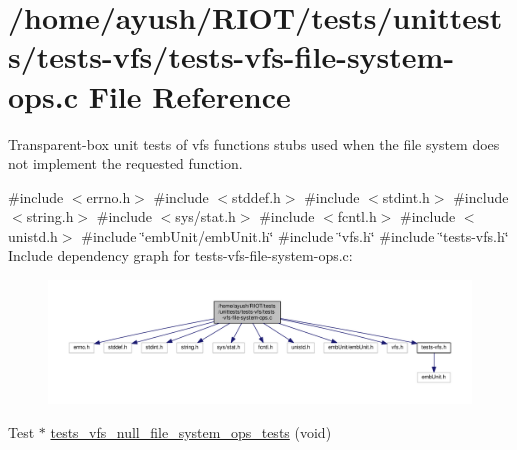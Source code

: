 \hypertarget{tests-vfs-file-system-ops_8c}{}\section{/home/ayush/\+R\+I\+O\+T/tests/unittests/tests-\/vfs/tests-\/vfs-\/file-\/system-\/ops.c File Reference}
\label{tests-vfs-file-system-ops_8c}


Transparent-\/box unit tests of vfs functions stubs used when the file system does not implement the requested function.  


{\ttfamily \#include $<$errno.\+h$>$}\newline
{\ttfamily \#include $<$stddef.\+h$>$}\newline
{\ttfamily \#include $<$stdint.\+h$>$}\newline
{\ttfamily \#include $<$string.\+h$>$}\newline
{\ttfamily \#include $<$sys/stat.\+h$>$}\newline
{\ttfamily \#include $<$fcntl.\+h$>$}\newline
{\ttfamily \#include $<$unistd.\+h$>$}\newline
{\ttfamily \#include \char`\"{}emb\+Unit/emb\+Unit.\+h\char`\"{}}\newline
{\ttfamily \#include \char`\"{}vfs.\+h\char`\"{}}\newline
{\ttfamily \#include \char`\"{}tests-\/vfs.\+h\char`\"{}}\newline
Include dependency graph for tests-\/vfs-\/file-\/system-\/ops.c\+:
\nopagebreak
\begin{figure}[H]
\begin{center}
\leavevmode
\includegraphics[width=350pt]{tests-vfs-file-system-ops_8c__incl}
\end{center}
\end{figure}
\begin{DoxyCompactItemize}
\item 
Test $\ast$ \hyperlink{tests-vfs-file-system-ops_8c_af7fa3a64422e93a058748b6bd2516ae3}{tests\+\_\+vfs\+\_\+null\+\_\+file\+\_\+system\+\_\+ops\+\_\+tests} (void)
\end{DoxyCompactItemize}


